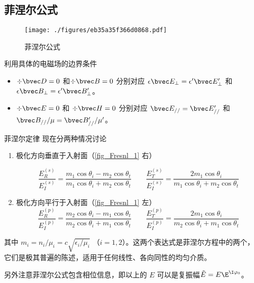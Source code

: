 
\begin{issues}
\issueTODO
\end{issues}


\subsection{菲涅尔公式}
\begin{figure}[ht]
\centering
\texttt{[image: ./figures/eb35a35f366d0868.pdf]}
\caption{菲涅尔公式} \label{fig_Fresnl_1}
\end{figure}
 
利用具体的电磁场的边界条件 %
\begin{itemize}
\item $\div \bvec D = 0$ 和$\div \bvec B = 0$  分别对应 $\epsilon \bvec E_\bot = \epsilon' \bvec E'_\bot$ 和 $\epsilon \bvec B_\bot = \epsilon' \bvec B'_\bot$。

\item $\div \bvec E = 0$ 和 $\div \bvec H = 0$ 分别对应 $\bvec E_{//} = \bvec E'_{//}$ 和 $\bvec B_{//}/\mu = \bvec B'_{//}/\mu'$。
\end{itemize}

\begin{theorem}{菲涅尔定律}
现在分两种情况讨论
\begin{enumerate}
\item 极化方向垂直于入射面（\autoref{fig_Fresnl_1} 右）

\begin{equation}
\frac{E_R^{(s)}}{E_I^{(s)}} =  \frac{m_1\cos{\theta_i} - m_2\cos\theta_t}{m_1\cos\theta_i + m_2\cos\theta_t}
\qquad
\frac{E_T^{(s)}}{E_I^{(s)}} = \frac{2 m_1\cos\theta_i}{m_1\cos\theta_i + m_2\cos\theta_t}
\end{equation}

\item 极化方向平行于入射面（\autoref{fig_Fresnl_1} 左）
\begin{equation}\label{eq_Fresnl_2}
\frac{E_R^{(p)}}{E_I^{(p)}} =  \frac{m_2\cos\theta_i - m_1\cos\theta_t}{m_2 \cos\theta_i + m_1\cos\theta_t}
\qquad
\frac{E_T^{(p)}}{E_I^{(p)}} =  \frac{2 m_1\cos\theta_i}{m_2\cos\theta_i + m_1\cos\theta_t}
\end{equation}
\end{enumerate}
其中 $m_i=n_i/\mu_i = c\sqrt{\epsilon_i/\mu_i}$ （$i=1,2$）。这两个表达式是菲涅尔方程中的两个，它们是极其普遍的陈述，适用于任何线性、各向同性的均匀介质。

另外注意菲涅尔公式包含相位信息，即以上的 $E$ 可以是复振幅$\tilde E=E \E^{\I \varphi_0}$。 
\end{theorem}

